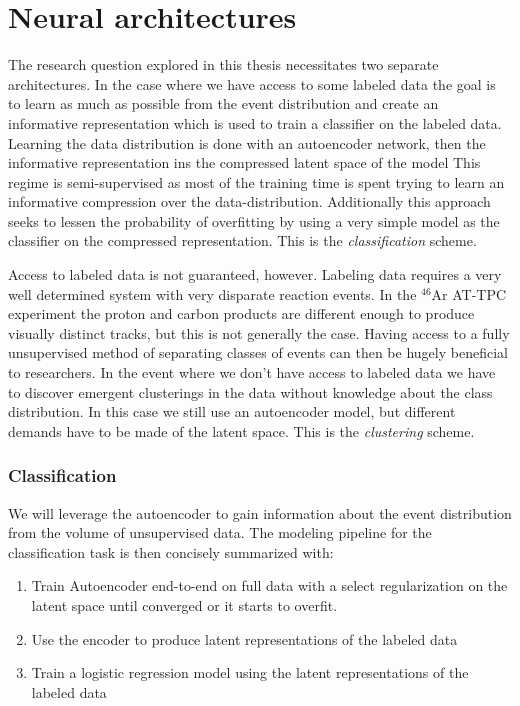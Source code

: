 \chapter{Neural architectures}\label{ch:architectures}

The research question explored in this thesis necessitates two separate architectures. In the case where we have access to some labeled data the goal is to learn as much as possible from the event distribution and create an informative representation which is used to train a classifier on the labeled data. Learning the data distribution is done with an autoencoder network, then the informative representation ins the compressed latent space of the model This regime is semi-supervised as most of the training time is spent trying to learn an informative compression over the data-distribution. Additionally this approach seeks to lessen the probability of overfitting by using a very simple model as the classifier on the compressed representation. This is the \textit{classification} scheme.

 Access to labeled data is not guaranteed, however. Labeling data requires a very well determined system with very disparate reaction events. In the ${}^{46}$Ar AT-TPC experiment the proton and carbon products are different enough to produce visually distinct tracks, but this is not generally the case. Having access to a fully unsupervised method of separating classes of events can then be hugely beneficial to researchers. In the event where we don't have access to labeled data we have to discover emergent clusterings in the data without knowledge about the class  distribution. In this case we still use an autoencoder model, but different demands have to be made of the latent space. This is the \textit{clustering} scheme. 

\subsection{Classification}
We will leverage  the autoencoder to gain information about the event distribution from the volume of unsupervised data. The modeling pipeline for the classification task is then concisely summarized with: 

\begin{enumerate}
\item Train Autoencoder end-to-end on full data with a select regularization on the latent space until converged or it starts to overfit. 
\item Use the encoder to produce latent representations of the labeled data 
\item Train a logistic regression model using the latent representations of the labeled data 
\end{enumerate}

